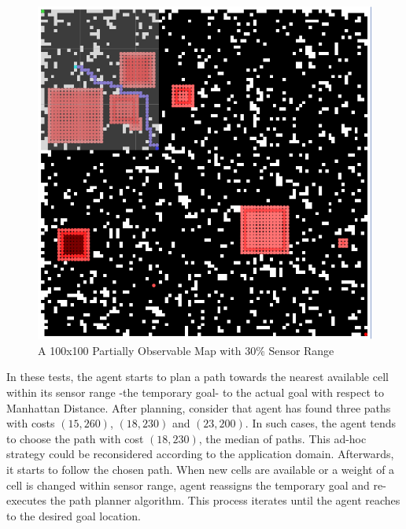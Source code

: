 \documentclass[10pt,journal]{IEEEtran}
\begin{document}
\begin{figure}
\centering
\includegraphics[scale=0.3]{experimental/initialSearch}
\caption{A 100x100 Partially Observable Map with 30\% Sensor Range}
\label{fig:initialSearch}
\end{figure}

In these tests, the agent starts to plan a path towards the nearest available cell within its sensor range -the temporary goal- to the actual goal with respect to Manhattan Distance. After planning, consider that agent has found three paths with costs $(15, 260)$, $(18, 230)$ and $(23, 200)$. In such cases, the agent tends to choose the path with cost $(18, 230)$, the median of paths. This ad-hoc strategy could be reconsidered according to the application domain. Afterwards, it starts to follow the chosen path. When new cells are available or a weight of a cell is changed within sensor range, agent reassigns the temporary goal and re-executes the path planner algorithm. This process iterates until the agent reaches to the desired goal location.
\end{document}
